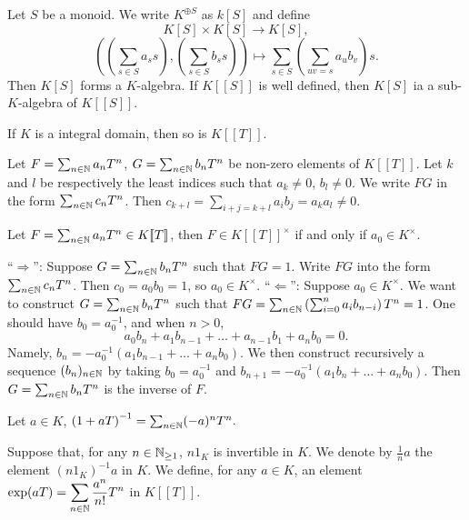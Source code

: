 \begin{exampleenv}
    Let $S$ be a monoid. We write $K^{\oplus S}$ as $k[S]$ and define 
    $$K[S]\times K[S]\longrightarrow K[S],$$
    $$\left(\left(\sum_{s\in S}a_s s\right),\left(\sum_{s\in S}b_s s\right)\right)\longmapsto \sum_{s\in S}\left(\sum_{uv=s}a_ub_v\right)s.$$
    Then $K[S]$ forms a $K$-algebra. If $K[\![S]\!]$ is well defined, then $K[S]$ ia a sub-$K$-algebra of $K[\![S]\!]$.
\end{exampleenv}
\begin{propositionenv}
    If $K$ is a integral domain, then so is $K[\![T]\!]$.
\end{propositionenv}
\begin{proofenv}
    Let $F=\sum_{n\in \mathbb{N}}a_nT^n$, $G=\sum_{n\in \mathbb{N}}b_nT^n$ be non-zero elements of $K[\![T]\!]$. Let $k$ and $l$ be respectively the least indices such that $a_k\not=0$, $b_l\not=0$. We write $FG$ in the form $\sum_{n\in \mathbb{N}}c_nT^n$. Then $c_{k+l}=\sum_{i+j=k+l}a_ib_j=a_ka_l\not=0.$
\end{proofenv}
\begin{propositionenv}
    Let $F=\sum_{n\in \mathbb{N}}a_nT^n\in K[\![T]\!]$, then $F\in K[\![T]\!]^\times$ if and only if $a_0\in K^\times$.
\end{propositionenv}
\begin{proofenv}
    ``$\Rightarrow$'': Suppose $G=\sum_{n\in\mathbb{N}}b_nT^n$ such that $FG=1$. Write $FG$ into the form $\sum_{n\in \mathbb{N}}c_nT^n$. Then $c_0=a_0b_0=1$, so $a_0\in K^\times$.
    \newline
    ``$\Leftarrow$'': Suppose $a_0\in K^\times$. We want to construct $G=\sum_{n\in\mathbb{N}}b_nT^n$ such that $FG=\sum_{n\in\mathbb{N}}\left(\sum_{i=0}^{n}a_ib_{n-i}\right)T^n=1$. One should have $b_0=a_0^{-1}$, and when $n>0$, 
    $$a_0b_n+a_1b_{n-1}+\dots+a_{n-1}b_1+a_nb_0=0.$$
    Namely, $b_n=-a_0^{-1}\left(a_1b_{n-1}+\dots+a_nb_0\right)$. We then construct recursively a sequence $(b_n)_{n\in\mathbb{N}}$ by taking $b_0=a_0^{-1}$ and $b_{n+1}=-a_0^{-1}\left(a_1b_n+\dots+a_nb_0\right)$. Then $G=\sum_{n\in\mathbb{N}}b_nT^n$ is the inverse of $F$.
\end{proofenv}
\begin{exampleenv}
    Let $a\in K$, $\left(1+aT\right)^{-1}=\sum_{n\in\mathbb{N}}(-a)^nT^n.$
\end{exampleenv}
\begin{definitionenv}
    Suppose that, for any $n\in \mathbb{N}_{\ge 1}$, $n1_K$ is invertible in $K$. We denote by $\frac{1}{n} a$ the element $\left(n1_K\right)^{-1}a$ in $K$. We define, for any $a\in K$, an element $\displaystyle\exp(aT)=\sum_{n\in\mathbb{N}}\frac{a^n}{n!}T^n$ in $K[\![T]\!]$.
\end{definitionenv}
